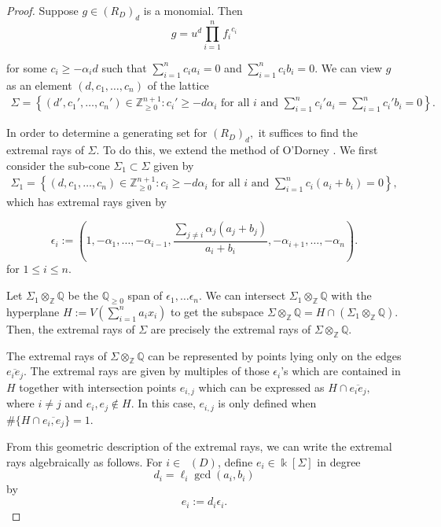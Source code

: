\documentclass{amsart}
\theoremstyle{plain}
\theoremstyle{definition}
\theoremstyle{remark}
\numberwithin{equation}{subsection}
\newcommand\bq{{\mathbb Q}}
\newcommand\bz{{\mathbb Z}}
\newcommand\bk{{\Bbbk}}
\newcommand\bida{a}
\newcommand\bidb{b}
\DeclareMathOperator{\Te}{T_=}
\begin{document}
\begin{proof}
Suppose $g
\in (R_D)_d$ is a monomial.
 Then 
\[
	g = u^d \prod_{i = 1}^n {f_i}^{c_i}
\]

\noindent
for some $c_i \ge - \alpha_i d$ such that $\sum_{i=1}^n c_i \bida_i = 0$
and $\sum_{i=1}^n c_i \bidb_i = 0$. We can view $g$ as an element $(d, c_1, \ldots, c_n)$ of the
lattice 
\begin{align*}
	\Sigma = \left\{ (d', c_1', \ldots, c_n') \in \bz_{\geq 0}^{n+1} \colon c_i' \ge - d
\alpha_i \text{ for all }i \text{ and }\sum_{i=1}^n c_i' \bida_i = \sum_{i =
1}^n c_i' \bidb_i = 0 \right \}.	
\end{align*}

In order to determine a generating
set for $(R_D)_d,$ it suffices to find the extremal rays of $\Sigma.$
To do this, we extend the method of O'Dorney \cite[Theorem 8]{dorney:canonical}. 
We first consider the sub-cone $\Sigma_1 \subset \Sigma$
given by
\begin{align*}
	\Sigma_1 = \left\{ (d, c_1, \ldots, c_n) \in \bz_{\geq 0}^{n+1} \colon c_i \ge -
d \alpha_i \text{ for all }i \text{ and }\sum_{i=1}^n c_i (\bida_i+\bidb_i) = 0
\right\},
\end{align*}
which
has extremal rays given by
 
\[
	\epsilon_i := \left(1, -\alpha_1, \ldots, -\alpha_{i-1}, \frac{\sum_{j \ne i}
	\alpha_j (\bida_j + \bidb_j)}{\bida_i + \bidb_i}, -\alpha_{i + 1},
	\ldots, -\alpha_n \right).
\]
for $1 \leq i \leq n$.

Let $\Sigma_1 \otimes_\bz \bq$ be the $\bq_{\ge 0}$ span of $\epsilon_1, \ldots \epsilon_n$.
We can intersect $\Sigma_1 \otimes_\bz \bq$ with the hyperplane $H :=
V(\sum_{i=1}^n \bida_i x_i)$  to get the subspace $\Sigma \otimes_\bz \bq = H \cap (\Sigma_1
\otimes_\bz \bq)$.  Then, the extremal rays of $\Sigma$ are precisely the extremal 
rays of $\Sigma \otimes_\bz \bq$.

The extremal rays of $\Sigma \otimes_\bz \bq$ can be represented by points
lying only on the edges 
$\overline{e_i e_j}$.
The extremal rays are given by multiples of those $\epsilon_i$'s
which are contained in $H$ together with intersection points $e_{i, j}$ which
can be expressed as $H \cap \overline{e_i e_j},$ where $i \neq j$ and $e_i,
e_j \notin H$. In this case, $e_{i,j}$ is only defined when
$\# \{H \cap \overline{e_i, e_j}\} = 1$.


From this geometric description of the extremal rays, we can write
the extremal rays algebraically as follows.
For $i \in \Te(D)$, define $e_i \in \bk[\Sigma]$ in degree 
\[
	d_i = \ell_i \gcd(a_i, b_i)
\]
by 
\[
	e_i := d_i \epsilon_i.
\]


\end{proof}
\end{document}
